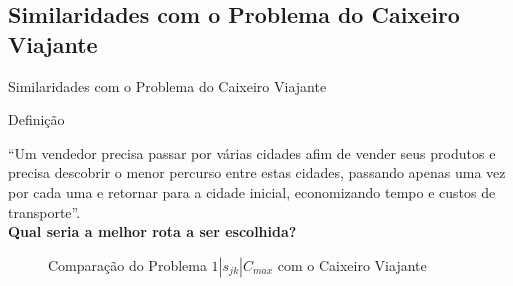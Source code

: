 \documentclass{beamer}
\begin{document}
\subsection{Similaridades com o Problema do Caixeiro Viajante}
\begin{frame}{Similaridades com o Problema do Caixeiro Viajante}
\begin{block}{Definição}
\begin{center}
``Um vendedor precisa passar por várias cidades afim de vender seus produtos e precisa descobrir o menor percurso entre estas cidades, passando apenas uma vez por cada uma e retornar para a cidade inicial, economizando tempo e custos de transporte''.\\

\textbf{Qual seria a melhor rota a ser escolhida?}
\end{center}
\end{block}
\begin{figure}[h]
\centering
{}
\quad 
{}
\caption{Comparação do Problema $1|s_{jk}|C_{max}$ com o Caixeiro Viajante}
\label{fig01}
\end{figure}
\end{frame}

\end{document}
